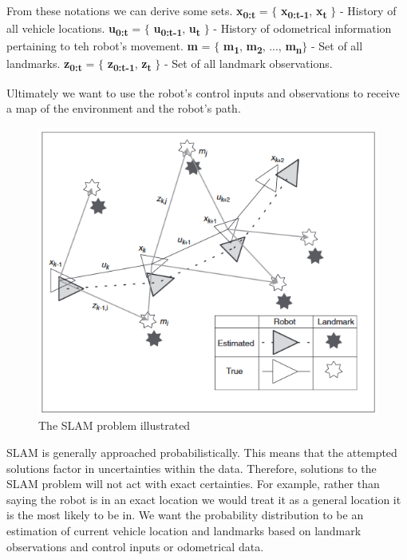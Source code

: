 			From these notations we can derive some sets. \newline
			\textbf{x\textsubscript{0:t}} = $\lbrace$ \textbf{x\textsubscript{0:t-1}}, \textbf{x\textsubscript{t}} $\rbrace$ - History of all vehicle locations. \newline
			\textbf{u\textsubscript{0:t}} = $\lbrace$ \textbf{u\textsubscript{0:t-1}}, \textbf{u\textsubscript{t}} $\rbrace$ - History of odometrical information pertaining to teh robot's movement. \newline
			\textbf{m} = $\lbrace$ \textbf{m\textsubscript{1}}, \textbf{m\textsubscript{2}}, ..., \textbf{m\textsubscript{n}}$\rbrace$ - Set of all landmarks. \newline
			\textbf{z\textsubscript{0:t}} = $\lbrace$ \textbf{z\textsubscript{0:t-1}}, \textbf{z\textsubscript{t}} $\rbrace$ - Set of all landmark observations. \newline
			
			Ultimately we want to use the robot's control inputs and observations to receive a map of the environment and the robot's path.
			
			\begin{figure}[h]
				\includegraphics[scale=0.65]{ANALYSIS/slamdiagram.png}
				\caption{The SLAM problem illustrated \citep{durrant2006simultaneous}}
				\label{fig:slamillustration}
			\end{figure}
			
			SLAM is generally approached probabilistically. This means that the attempted solutions factor in uncertainties within the data. Therefore, solutions to the SLAM problem will not act with exact certainties. For example, rather than saying the robot is in an exact location we would treat it as a general location it is the most likely to be in. We want the probability distribution to be an estimation of current vehicle location and landmarks based on landmark observations and control inputs or odometrical data. 
			
